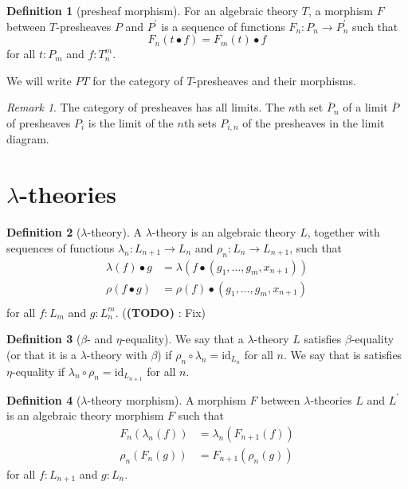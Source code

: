 \documentclass[a4paper]{amsbook}
\theoremstyle{definition}
\newtheorem{definition}{Definition}
\theoremstyle{remark}
\newtheorem{remark}{Remark}
\newcommand{\id}[1]{\ensuremath{\text{id}_{#1}}}
\newcommand\TODO{\textbf{(TODO)} }
\begin{document}
  \begin{definition}[presheaf morphism]
    For an algebraic theory $ T $, a morphism $ F $ between $ T $-presheaves $ P $ and $ P^\prime $ is a sequence of functions $ F_n: P_n \to P^\prime_n $ such that
    \[ F_n(t \bullet f) = F_m(t) \bullet f \]
    for all $ t: P_m $ and $ f: T_n^m $.
  \end{definition}

  We will write $ PT $ for the category of $ T $-presheaves and their morphisms.

  \begin{remark}
    The category of presheaves has all limits. The $ n $th set $ \overline{P}_n $ of a limit $ \overline{P} $ of presheaves $ P_i $ is the limit of the $ n $th sets $ P_{i, n} $ of the presheaves in the limit diagram.
  \end{remark}

  \section{\texorpdfstring{$ \lambda $-}{lambda-}theories}

  \begin{definition}[$ \lambda $-theory]
    A $ \lambda $-theory is an algebraic theory $ L $, together with sequences of functions $ \lambda_n: L_{n + 1} \to L_n $ and $ \rho_n: L_n \to L_{n + 1} $, such that
    \begin{align*}
      \lambda(f) \bullet g &= \lambda(f \bullet (g_1, \dots, g_m, x_{n + 1}))\\
      \rho(f \bullet g) &= \rho(f) \bullet (g_1, \dots, g_m, x_{n + 1})\\
    \end{align*}
    for all $ f: L_m $ and $ g: L_n^m $. (\TODO: Fix)
  \end{definition}

  \begin{definition}[$ \beta $- and $ \eta $-equality]
    We say that a $ \lambda $-theory $ L $ satisfies $ \beta $-equality (or that it is a $ \lambda $-theory with $ \beta $) if $ \rho_n \circ \lambda_n = \id{L_n} $ for all $ n $. We say that is satisfies $ \eta $-equality if $ \lambda_n \circ \rho_n = \id{L_{n + 1}} $ for all $ n $.
  \end{definition}

  \begin{definition}[$ \lambda $-theory morphism]
    A morphism $ F $ between $ \lambda $-theories $ L $ and $ L^\prime $ is an algebraic theory morphism $ F $ such that
    \begin{align*}
      F_n(\lambda_n(f)) &= \lambda_n(F_{n + 1}(f))\\
      \rho_n(F_n(g)) &= F_{n + 1}(\rho_n(g))
    \end{align*}
    for all $ f: L_{n + 1} $ and $ g: L_n $.
  \end{definition}
\end{document}
